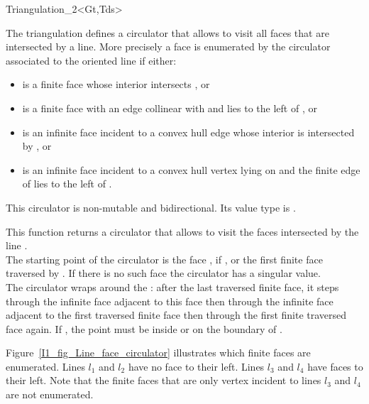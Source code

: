 \begin{ccClassTemplate}{Triangulation_2<Gt,Tds>}
\ccGlue
{}





The triangulation defines a circulator that allows
to visit all faces that are intersected by a line. 
More precisely a face   is enumerated by the circulator 
associated to the oriented line  if either:
\begin{itemize}\ccTexHtml{\itemsep0pt}{}
\item 
{} is a finite face whose interior intersects , or
\item
  is a finite face with  an edge collinear with  and lies
to the left of , or
\item
{} is an infinite face incident to a  convex hull edge 
whose interior is intersected
by , or
\item
{} is an infinite face incident to a  convex hull vertex
lying on   and the finite edge of 
lies to the left of . 
\end{itemize}
This circulator is
non-mutable and bidirectional. Its value type is .

{ This function returns a circulator that allows to visit the 
 faces intersected by the line . \\
 The starting point of the circulator is the face , if
 , or the first finite face traversed by .
 If there is no such face the circulator has a singular value.\\
 The circulator wraps around the  :
after the last traversed finite face, it steps through the infinite face adjacent
to this face then through the infinite face adjacent to the first
traversed finite face then through the first finite traversed face again.
\ccPrecond If , the point  must be
inside or on the boundary of .}

Figure~\ref{I1_fig_Line_face_circulator} illustrates which finite faces are enumerated. Lines
$l_1$ and $l_2$ have no face to their left. Lines $l_3$ and $l_4$
have faces to their left. Note that the finite faces that are only vertex
incident to lines $l_3$ and  $l_4$ are not enumerated.


\end{ccClassTemplate}
